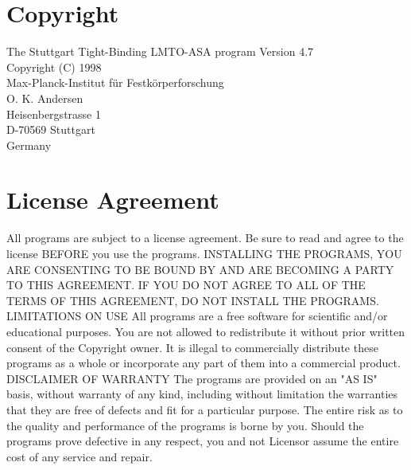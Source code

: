 \documentclass[aps,twocolumn,a4]{revtex4}
\begin{document}
%
\section{Copyright}
\label{copyri}
\noindent
 The Stuttgart Tight-Binding LMTO-ASA program Version 4.7    \\
    Copyright (C) 1998              \\
\indent
      Max-Planck-Institut f\"ur Festk\"orperforschung        \\
\indent
      O. K. Andersen                                         \\
\indent
      Heisenbergstrasse 1                                    \\
\indent
      D-70569 Stuttgart                                      \\
\indent
      Germany                                                \\

\section{License Agreement}
\label{license}
\noindent
All programs are subject to a license agreement. Be sure to read and 
agree to the license BEFORE you use the programs. 
\newline
\newline
\noindent
INSTALLING THE PROGRAMS, YOU ARE CONSENTING TO BE BOUND BY AND ARE 
BECOMING A PARTY TO THIS AGREEMENT. IF YOU DO NOT AGREE
TO ALL OF THE TERMS OF THIS AGREEMENT, DO NOT INSTALL THE PROGRAMS. 
\newline
\newline
\noindent
LIMITATIONS ON USE 
\newline
\newline
\noindent
All programs are a free software for scientific and/or educational
purposes. You are not allowed to redistribute it without prior written
consent of the Copyright owner. It is
illegal to commercially distribute these programs as a whole or
incorporate any part of them into a commercial product. 
\newline
\newline
\noindent
DISCLAIMER OF WARRANTY 
\newline
\newline
\noindent
The programs are provided on an "AS IS" basis, without warranty of any
kind, including without limitation the warranties that they are free of
defects and fit for a particular
purpose. The entire risk as to the quality and performance of the
programs is borne by you. Should the programs prove defective in any
respect, you and not Licensor assume
the entire cost of any service and repair. 
\end{document}
